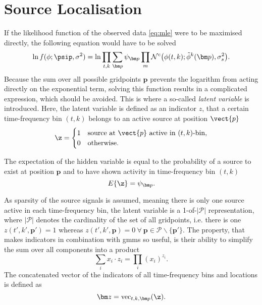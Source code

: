 \section{Source Localisation}
\label{sec:algLocEst}

If the likelihood function of the observed data \eqref{eq:mle} were to be maximised directly, the following equation would have to be solved
\begin{equation}
    \ln f(\phi;\psip,\sigma^2) = \ln\prod_{t,k}\sum_{\bm p}\psi_{\bm p}\prod_m\mathcal{N}^c\big(\phi(t,k);\tilde\phi^k(\bm p),\sigma^2_{s}\big).
\end{equation}
Because the sum over all possible gridpoints $\bm p$ prevents the logarithm from acting directly on the exponential term, solving this function results in a complicated expression, which should be avoided. This is where a so-called \textit{latent variable} is introduced. Here, the latent variable is defined as an indicator $z$, that a certain time-frequency bin $(t,k)$ belongs to an active source at position $\vect{p}$ 
\begin{equation}
	\z=\begin{cases}
	    1& \text{source at $\vect{p}$ active in $(t,k)$-bin},\\
       0& \text{otherwise}.
	\end{cases}
\end{equation}

The expectation of the hidden variable is equal to the probability of a source to exist at position $\bm p$ and to have shown activity in time-frequency bin $(t, k)$ 
\begin{equation}
    E\{\z\}=\psi_{\bm p}.
\end{equation}

As sparsity of the source signals is assumed, meaning there is only one source active in each time-frequency bin, the latent variable is a 1-of-$|\mathcal{P}|$ representation, where $|\mathcal{P}|$ denotes the cardinality of the set of all gridpoints, i.e. there is one $z(t',k',\bm p')=1$ whereas $z(t',k',\bm p)=0\ \forall\ \bm p\in\mathcal{P}\smallsetminus\{\bm p'\}$. The property, that makes indicators in combination with \glspl{gmm} so useful, is their ability to simplify the sum over all components into a product
\begin{equation}
\label{eq:indicator-sum-product}
    \sum_{i}x_i\cdot z_i=\prod_i (x_i)^{z_i}.
\end{equation}
The concatenated vector of the indicators of all time-frequency bins and locations is defined as
\begin{equation}
    \bm z=\text{vec}_{t,k,\bm p}(\z).
\end{equation}

